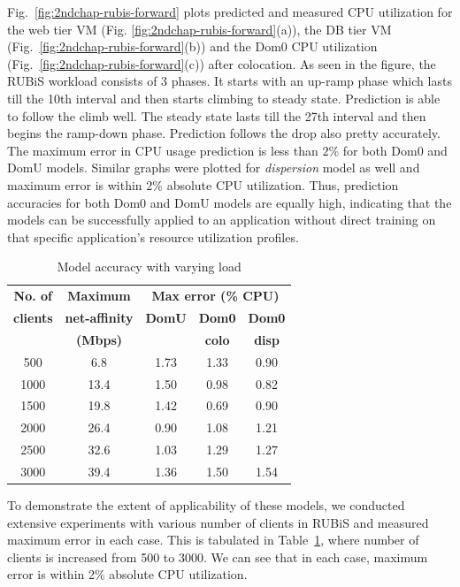 Fig.~\ref{fig:2ndchap-rubis-forward} plots predicted and measured CPU
utilization for the web tier VM (Fig. \ref{fig:2ndchap-rubis-forward}(a)),
the DB tier VM (Fig.~\ref{fig:2ndchap-rubis-forward}(b)) and the
Dom0 CPU utilization (Fig.~\ref{fig:2ndchap-rubis-forward}(c)) after colocation.
As seen in the figure, the RUBiS workload consists of 3 phases. It starts
with an
up-ramp phase which lasts till the 10th interval and then starts climbing
to steady state. Prediction is able to follow the climb well. The
steady state lasts till the 27th interval and then begins the ramp-down
phase. Prediction follows the drop also pretty accurately.
The maximum error in CPU
usage prediction is less than $2\%$ for both Dom0 and DomU models.
Similar graphs were plotted for \emph{dispersion} model as well and
maximum error is within 2\% absolute CPU utilization.
Thus, prediction accuracies for both Dom0 and DomU models are equally 
high, indicating that the models
can be successfully applied to an application without direct training on that
specific application's resource utilization profiles.

\begin{table}[t]
	\centering
	\caption{Model accuracy with varying load}
	\begin{tabular}{|c|c|c|c|c|} \hline
		\textbf{No. of} & \textbf{Maximum}  & \multicolumn{3}{|c|}{\textbf{Max error (\% CPU)}} \\  \cline{3-5}
	\textbf{clients} & \textbf{net-affinity} & \textbf{DomU} &  \textbf{Dom0} & \textbf{Dom0} \\
		 & \textbf{(Mbps)} &  &  \textbf{colo} & \textbf{disp} \\ \hline  %
  500 & 6.8 & 1.73 & 1.33 & 0.90 \\
	1000 & 13.4 & 1.50 & 0.98 & 0.82 \\
	1500 & 19.8 & 1.42 & 0.69 & 0.90 \\
	2000 & 26.4 & 0.90 & 1.08  & 1.21 \\
	2500 & 32.6 & 1.03 & 1.29 & 1.27 \\
	3000 & 39.4 & 1.36 & 1.50 & 1.54 \\ \hline
	\end{tabular}
	\label{tab:xennumclients}
\end{table}


To demonstrate the extent of applicability of these models,
we conducted extensive experiments with various number of clients
in RUBiS and measured maximum error
in each case. This is tabulated in Table~\ref{tab:xennumclients},
where number of clients is increased
from 500 to 3000. We can see that in each case, maximum error
is within 2\% absolute CPU utilization.

